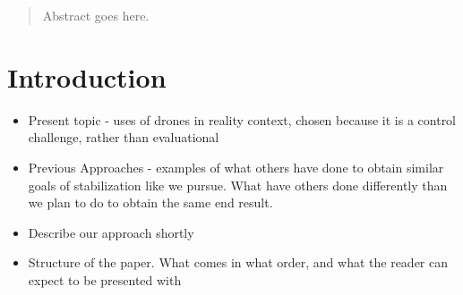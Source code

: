 \maketitle

\begin{abstract}
Abstract goes here.
\end{abstract}



%
\IEEEpeerreviewmaketitle


\section{Introduction}
\begin{itemize}
\item Present topic - uses of drones in reality context, chosen because it is a control challenge, rather than evaluational\\
\item Previous Approaches - examples of what others have done to obtain similar goals of stabilization like we pursue. What have others done differently than we plan to do to obtain the same end result. \\ 
\item Describe our approach shortly
\item Structure of the paper. What comes in what order, and what the reader can expect to be presented with
\end{itemize}



